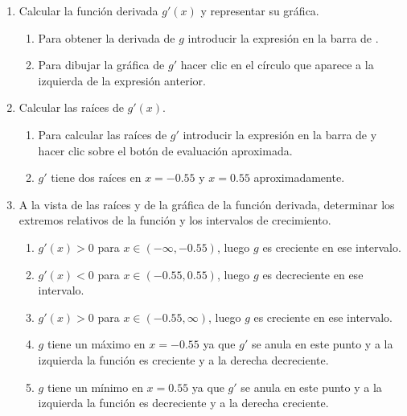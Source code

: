 \begin{enumerate}[leftmargin=*]
\begin{enumerate}
      \item Calcular la función derivada $g'(x)$ y representar su gráfica.
            \begin{indication}
            \begin{enumerate}
            \item Para obtener la derivada de $g$ introducir la expresión  en la barra de .
            \item Para dibujar la gráfica de $g'$ hacer clic en el círculo que aparece a la izquierda de la expresión anterior.
            \end{enumerate}
            \end{indication}

      \item Calcular las raíces de $g'(x).$
            \begin{indication}
            \begin{enumerate}
            \item Para calcular las raíces de $g'$ introducir la expresión  en la barra de  y hacer clic sobre el botón de evaluación aproximada.
            \item $g'$ tiene dos raíces en $x=-0.55$ y $x=0.55$ aproximadamente.
            \end{enumerate}
            \end{indication}

      \item  A la vista de las raíces y de la gráfica de la función derivada, determinar los extremos relativos de la función y los intervalos de crecimiento.
            \begin{indication}
            \begin{enumerate}
            \item $g'(x)>0$ para $x\in (-\infty, -0.55)$, luego $g$ es creciente en ese intervalo.
            \item $g'(x)<0$ para $x\in (-0.55, 0.55)$, luego $g$ es decreciente en ese intervalo.
            \item $g'(x)>0$ para $x\in (-0.55, \infty)$, luego $g$ es creciente en ese intervalo.
            \item $g$ tiene un máximo en $x=-0.55$ ya que $g'$ se anula en este punto y a la izquierda la función es creciente y a la derecha decreciente.
            \item $g$ tiene un mínimo en $x=0.55$ ya que $g'$ se anula en este punto y a la izquierda la función es decreciente y a la derecha creciente.
            \end{enumerate}
            \end{indication}


\end{enumerate}
\end{enumerate}
